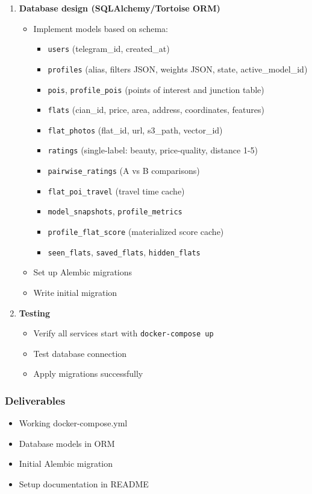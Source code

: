 \documentclass[12pt,a4paper]{article}
\begin{document}
\begin{enumerate}
    \item \textbf{Database design (SQLAlchemy/Tortoise ORM)}
    \begin{itemize}
        \item Implement models based on schema:
        \begin{itemize}
            \item \texttt{users} (telegram\_id, created\_at)
            \item \texttt{profiles} (alias, filters JSON, weights JSON, state, active\_model\_id)
            \item \texttt{pois}, \texttt{profile\_pois} (points of interest and junction table)
            \item \texttt{flats} (cian\_id, price, area, address, coordinates, features)
            \item \texttt{flat\_photos} (flat\_id, url, s3\_path, vector\_id)
            \item \texttt{ratings} (single-label: beauty, price-quality, distance 1-5)
            \item \texttt{pairwise\_ratings} (A vs B comparisons)
            \item \texttt{flat\_poi\_travel} (travel time cache)
            \item \texttt{model\_snapshots}, \texttt{profile\_metrics}
            \item \texttt{profile\_flat\_score} (materialized score cache)
            \item \texttt{seen\_flats}, \texttt{saved\_flats}, \texttt{hidden\_flats}
        \end{itemize}
        \item Set up Alembic migrations
        \item Write initial migration
    \end{itemize}
    
    \item \textbf{Testing}
    \begin{itemize}
        \item Verify all services start with \texttt{docker-compose up}
        \item Test database connection
        \item Apply migrations successfully
    \end{itemize}
\end{enumerate}

\subsubsection{Deliverables}
\begin{itemize}
    \item Working docker-compose.yml
    \item Database models in ORM
    \item Initial Alembic migration
    \item Setup documentation in README
\end{itemize}
\end{document}
